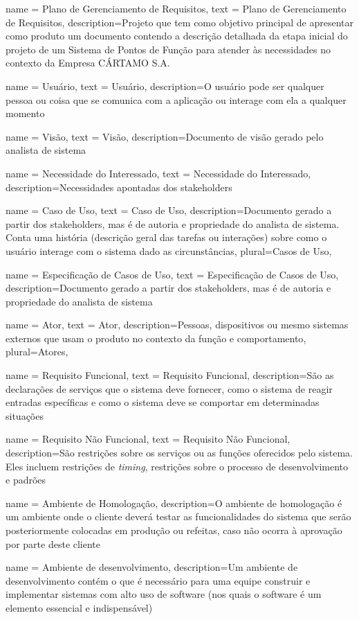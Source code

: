 {
	name = Plano de Gerenciamento de Requisitos,
	text = Pla\-no de Ge\-ren\-ci\-a\-men\-to de Re\-qui\-si\-tos,
	description={Projeto que tem como objetivo principal de apresentar como produto um documento 
contendo  a  descrição  detalhada da etapa inicial do projeto de um Sistema de Pontos  de Função 
para atender às necessidades no contexto da Empresa CÁRTAMO S.A.}
}


{
	name = Usu\'ario,
	text = Usu\'ario,
	description={O usuário pode ser qualquer pessoa ou coisa que se comunica com a aplicação ou interage com ela a qualquer momento}
}


{
	name = Vis\~ao,
	text = Vis\~ao,
	description={Documento de visão gerado pelo analista de sistema}
}


{
	name = Necessidade do Interessado,
	text = Necessidade do Interessado,
	description={Necessidades apontadas dos stakeholders}
}

{
	name = Caso de Uso,
	text = Caso de Uso,
	description={Documento gerado a partir dos stakeholders, mas é de autoria e propriedade do analista de sistema. Conta uma história (descrição geral das tarefas ou interações) sobre como o usuário interage com o sistema dado as circunstâncias},
	plural=Casos de Uso,
}



{
	name = Especifica\c c\~ao de Casos de Uso,
	text = Especifica\c c\~ao de Casos de Uso,
	description={Documento gerado a partir dos stakeholders, mas é de autoria e propriedade do analista de sistema}
}

{
	name = Ator,
	text = Ator,
	description={Pessoas, dispositivos ou mesmo sistemas externos que usam o produto no contexto da função e comportamento},
	plural=Atores,
}


{
	name = Requisito Funcional,
	text = Requisito Funcional,
	description={São as declarações de serviços que o sistema deve fornecer, como o sistema de reagir entradas específicas e como o sistema deve se comportar em determinadas situações}
}

{
	name = Requisito N\~ao Funcional,
	text = Requisito N\~ao Funcional,
	description={São restrições sobre os serviços ou as funções oferecidos pelo sistema. Eles incluem restrições de \textit{timing}, restrições sobre o processo de desenvolvimento e padrões}
}

{
	name = Ambiente de Homologa\c c\~ao,
	description={O ambiente de homologação é um ambiente onde o
cliente deverá testar as funcionalidades do sistema que serão posteriormente colocadas
em produção ou refeitas, caso não ocorra à aprovação por parte deste cliente}
}

{
	name = Ambiente de desenvolvimento,
	description={Um ambiente de desenvolvimento contém o que é
necessário para uma equipe construir e implementar sistemas com alto uso de software
(nos quais o software é um elemento essencial e indispensável)}
}